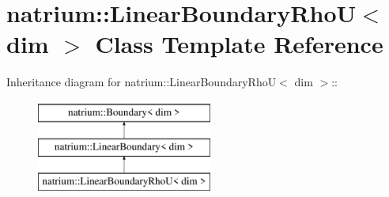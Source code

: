 \hypertarget{classnatrium_1_1LinearBoundaryRhoU}{
\section{natrium::LinearBoundaryRhoU$<$ dim $>$ Class Template Reference}
\label{classnatrium_1_1LinearBoundaryRhoU}
}
Inheritance diagram for natrium::LinearBoundaryRhoU$<$ dim $>$::\begin{figure}[H]
\begin{center}
\leavevmode
\includegraphics[height=3cm]{classnatrium_1_1LinearBoundaryRhoU}
\end{center}
\end{figure}
